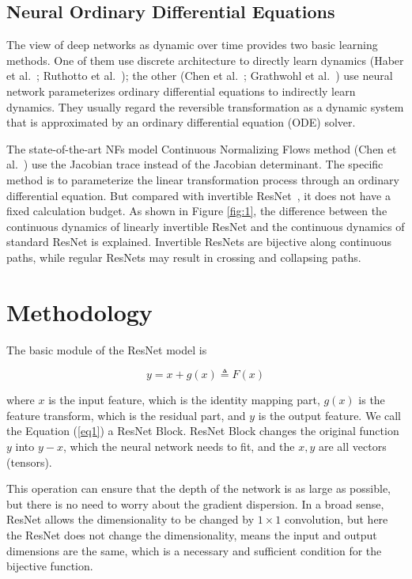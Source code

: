 \documentclass[final]{cvpr}
\begin{document}
\subsection{Neural Ordinary Differential Equations}
The view of deep networks as dynamic over time provides two basic learning methods. One of them use discrete architecture to directly learn dynamics (Haber et al.~\cite{haber2017stable}; Ruthotto et al.~\cite{ruthotto2019deep}); the other (Chen et al.~\cite{chen2018neural}; Grathwohl et al.~\cite{grathwohl2019scalable}) use neural network parameterizes ordinary differential equations to indirectly learn dynamics. They usually regard the reversible transformation as a dynamic system that is approximated by an ordinary differential equation (ODE) solver.

The state-of-the-art NFs model Continuous  Normalizing Flows method (Chen et al.~\cite{chen2018neural})  use the Jacobian trace instead of the Jacobian determinant. The specific method is to parameterize the linear transformation process through an ordinary differential equation. But compared with invertible ResNet~\cite{behrmann2019invertible}, it does not have a fixed calculation budget. As shown in Figure \ref{fig:1}, the difference between the continuous dynamics of linearly invertible ResNet and the continuous dynamics of standard ResNet is explained. Invertible ResNets are bijective along continuous paths, while regular ResNets may result in crossing and collapsing paths.


\section{Methodology}
The basic module of the ResNet model is

\begin{equation}
   y = x + g(x)\triangleq F(x)\label{eq1}
\end{equation}


where $x$ is the input feature, which is the identity mapping part, $g(x)$ is the feature transform, which is the residual part, and $y$ is the output feature. We call the Equation (\ref{eq1}) a ResNet Block. ResNet Block changes the original function $y$ into $y-x$, which the neural network needs to fit, and the $x,y$ are all vectors (tensors). 

This operation can ensure that the depth of the network is as large as possible, but there is no need to worry about the gradient dispersion. In a broad sense, ResNet allows the dimensionality to be changed by $1\times 1$ convolution, but here the ResNet does not change the dimensionality, means the input and output dimensions are the same, which is a necessary and sufficient condition for the bijective function.
\end{document}
